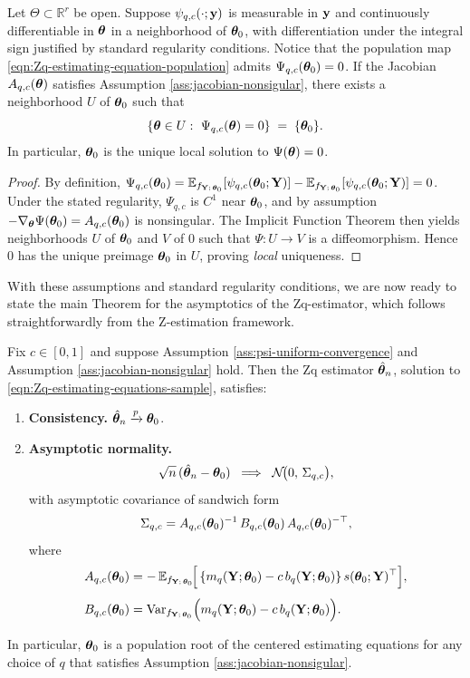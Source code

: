 \documentclass[twoside,11pt]{article}
\newcommand{\Var}{\operatorname{Var}}
\begin{document}
\begin{lemma}
\label{lem:local-id-centered}
Let $\Theta\subset\mathbb{R}^r$ be open. Suppose $\psi_{q,c}(\cdot;{\bf y})$ is measurable in ${\bf y}$
and continuously differentiable in ${\bm{\theta}}$ in a neighborhood of ${{\bm{\theta}}_0}$, with differentiation under
the integral sign justified by standard regularity conditions. Notice that the population map \eqref{eqn:Zq-estimating-equation-population} admits $\Psi_{q,c} ({{\bm{\theta}}_0})=0$. If the Jacobian $A_{q,c}({\bm{\theta}})$ satisfies Assumption \eqref{ass:jacobian-nonsigular}, there exists a neighborhood $U$ of ${{\bm{\theta}}_0}$ such that
\[
\{\bt\in U:\ \Psi_{q,c}(\bt)=0\}\;=\;\{\bto\}.
\]
In particular, ${{\bm{\theta}}_0}$ is the unique local solution to $\Psi({\bm{\theta}})=0$.
\end{lemma}

\begin{proof}
By definition,
$\Psi_{q,c}({{\bm{\theta}}_0})=\mathbb{E}_{f_{{\bf Y};\,{{\bm{\theta}}_0}}}[\psi_{q,c}({{\bm{\theta}}_0};{\bf Y})]-\mathbb{E}_{f_{{\bf Y};\,{{\bm{\theta}}_0}}}[\psi_{q,c}({{\bm{\theta}}_0};{\bf Y})]=0$.
Under the stated regularity, $\Psi_{q,c}$ is $C^1$ near ${{\bm{\theta}}_0}$, and by assumption
$-\nabla_{\bm{\theta}}\Psi({{\bm{\theta}}_0})=A_{q,c}({{\bm{\theta}}_0})$ is nonsingular. The Implicit Function
Theorem then yields neighborhoods $U$ of ${{\bm{\theta}}_0}$ and $V$ of $0$ such that
$\Psi:U\to V$ is a diffeomorphism. Hence $0$ has the unique preimage ${{\bm{\theta}}_0}$ in $U$,
proving \emph{local} uniqueness.
\end{proof}


With these assumptions and standard regularity conditions, we are now ready to state the main Theorem for the asymptotics of the Zq-estimator, which follows straightforwardly from the Z-estimation framework.

\begin{theorem}
\label{thm:Zq-asymptotics}
Fix $c \in [0,1]$ and suppose Assumption \eqref{ass:psi-uniform-convergence} and Assumption \eqref{ass:jacobian-nonsigular} hold. Then the Zq estimator $\hat{{\bm{\theta}}}_n$, solution to \eqref{eqn:Zq-estimating-equations-sample}, satisfies:

\begin{enumerate}
\item \textbf{Consistency.} $\hat{{\bm{\theta}}}_n \xrightarrow{p} {\bm{\theta}}_0$.
\item \textbf{Asymptotic normality.} 
\[
\sqrt{n}\,(\hat{{\bm{\theta}}}_n - {\bm{\theta}}_0)
\;\;\Longrightarrow\;\;
\mathcal N\!\big(0,\,\Sigma_{q,c}\big),
\]
with asymptotic covariance of sandwich form
\[
\Sigma_{q,c}
= A_{q,c}({\bm{\theta}}_0)^{-1}\, B_{q,c}({\bm{\theta}}_0)\, A_{q,c}({\bm{\theta}}_0)^{-\top},
\]
where
\begin{align*}
A_{q,c}(\bt_0) &= -\,\E_{f_{\Y;\,\bt_0}}\!\Big[\,\{m_q(\Y;\bt_0)-c\,b_q(\Y;\bt_0)\}\, s(\bt_0;\Y)^\top\Big],\\[4pt]
B_{q,c}(\bt_0) &= \Var_{f_{\Y;\,\bt_0}}\!\Big(m_q(\Y;\bt_0)-c\,b_q(\Y;\bt_0)\Big).
\end{align*}
\end{enumerate}
In particular, ${\bm{\theta}}_0$ is a population root of the centered estimating equations for any choice of $q$ that satisfies Assumption \eqref{ass:jacobian-nonsigular}.
\end{theorem}
\end{document}
